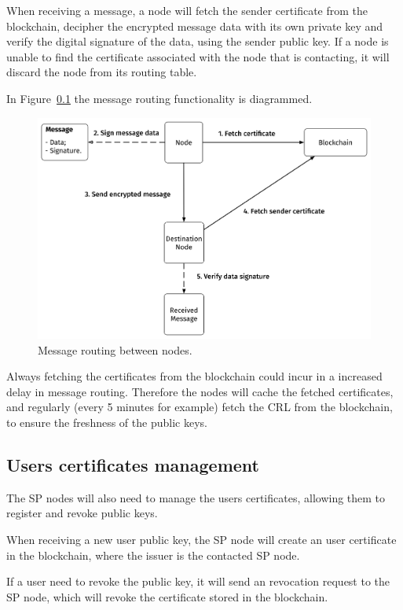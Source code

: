 When receiving a message, a node will fetch the sender certificate from the blockchain, decipher the encrypted message data with its own private key and verify the digital signature of the data, using the sender public key.
If a node is unable to find the certificate associated with the node that is contacting, it will discard the node from its routing table.

In Figure~\ref{} the message routing functionality is diagrammed.

\begin{figure}
    \includegraphics[width=\linewidth]{Figures/message-routing.png}
    \caption{Message routing between nodes.}
    \label{fig:message-routing}
\end{figure}

Always fetching the certificates from the blockchain could incur in a increased delay in message routing.
Therefore the nodes will cache the fetched certificates, and regularly (every 5 minutes for example) fetch the CRL from the blockchain, to ensure the freshness of the public keys.

\subsection{Users certificates management}
The SP nodes will also need to manage the users certificates, allowing them to register and revoke public keys.

When receiving a new user public key, the SP node will create an user certificate in the blockchain, where the issuer is the contacted SP node.

If a user need to revoke the public key, it will send an revocation request to the SP node, which will revoke the certificate stored in the blockchain.

